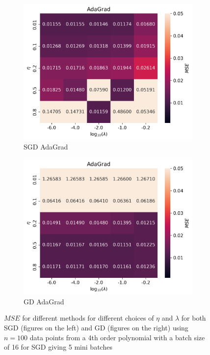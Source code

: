 \documentclass[11pt]{article}
\begin{document}
\begin{figure}[H]
\begin{subfigure}{.5\textwidth}
        \centering
        \includegraphics[width=\textwidth]{../figures/AdaGrad_SGD_eta_lmb.png}
        \caption{SGD AdaGrad}
        \label{fig:}
    \end{subfigure}
    \begin{subfigure}{.5\textwidth}
        \centering
        \includegraphics[width=\textwidth]{../figures/AdaGrad_GD_eta_lmb.png}
        \caption{GD AdaGrad}
        \label{fig:}
    \end{subfigure}
    \caption{$MSE$ for different methods for different choices of $\eta$ and $\lambda$ for both SGD (figures on the left) and GD (figures on the right) using $n=100$ data points from a 4th order polynomial with a batch size of 16 for SGD giving 5 mini batches}
    \label{fig:compare_ridge_2}
\end{figure}
\end{document}
